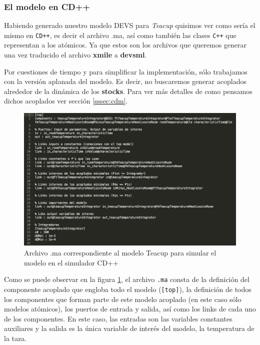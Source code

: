 \pagebreak

\subsubsection{El modelo en CD++}
Habiendo generado nuestro modelo DEVS para \textit{Teacup} quisimos ver como sería el mismo en \texttt{CD++}, es decir el archivo .ma, así como también las clases  \texttt{C++} que representan a los atómicos. Ya que estos son los archivos que queremos generar una vez traducido el archivo \textbf{xmile} a \textbf{devsml}.

Por cuestiones de tiempo y para simplificar la implementación, sólo trabajamos con la versión aplanada del modelo. Es decir, no buscaremos generar acoplados alrededor de la dinámica de los \textbf{stocks}. Para ver más detalles de como pensamos dichos acoplados ver sección \ref{sssec:cdm}.

\begin{figure}[!h]
\centering
\includegraphics[scale=0.5]{imagenes/teacup_mapeo/Teacup_ma}
\caption{Archivo .ma correspondiente al modelo Teacup para simular el modelo en el simulador CD++}
\label{fig:Teacup_ma}
\end{figure}

Como se puede observar en la figura \ref{fig:Teacup_ma}, el archivo \texttt{.ma} consta de la definición del componente acoplado que engloba todo el modelo (\texttt{[top]}), la definición de todos los componentes que forman parte de este modelo acoplado (en este caso sólo modelos atómicos), los puertos de entrada y salida, así como los links de cada uno de los componentes. En este caso, las entradas son las variables constantes auxiliares y la salida es la única variable de interés del modelo, la temperatura de la taza. 

